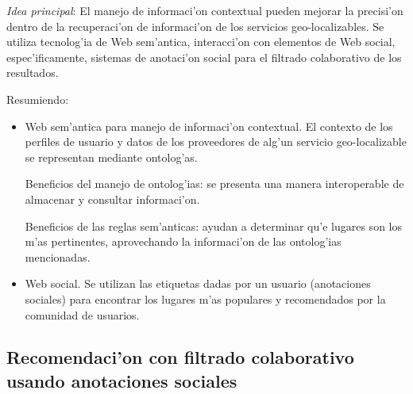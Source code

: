 \documentclass[11pt]{article}
\begin{document}
\textit{Idea principal}: El manejo de informaci'on contextual pueden mejorar la precisi'on dentro de la recuperaci'on de informaci'on de los servicios geo-localizables. Se utiliza tecnolog'ia de Web sem'antica, interacci'on con elementos de Web social, espec'ificamente, sistemas de anotaci'on social para el filtrado colaborativo de los resultados.

Resumiendo:
\begin{itemize}
\item Web sem'antica para manejo de informaci'on contextual. El contexto de los perfiles de usuario y datos de los proveedores de alg'un servicio geo-localizable se representan mediante ontolog'as. 

Beneficios del manejo de ontolog'ias: se presenta una manera interoperable de almacenar y consultar informaci'on.

Beneficios de las reglas sem'anticas: ayudan a determinar qu'e lugares son los m'as pertinentes, aprovechando la informaci'on de las ontolog'ias mencionadas.

\item Web social. Se utilizan las etiquetas dadas por un usuario (anotaciones sociales) para encontrar los lugares m'as populares y recomendados por la comunidad de usuarios.
\end{itemize}

\subsection{Recomendaci'on con filtrado colaborativo usando anotaciones sociales}
\end{document}
